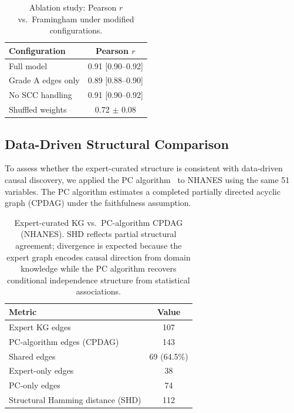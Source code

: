 \documentclass[runningheads]{llncs}
\begin{document}
\begin{table}[t]
\centering
\caption{Ablation study: Pearson $r$ vs.\ Framingham under
modified configurations.}\label{tab:ablation}
\small
\begin{tabular}{@{}lc@{}}
\toprule
\textbf{Configuration} & \textbf{Pearson $r$} \\
\midrule
Full model           & 0.91 [0.90--0.92] \\
Grade A edges only   & 0.89 [0.88--0.90] \\
No SCC handling      & 0.91 [0.90--0.92] \\
Shuffled weights     & 0.72 $\pm$ 0.08 \\
\bottomrule
\end{tabular}
\end{table}

\subsection{Data-Driven Structural Comparison}\label{sec:pcalg}

To assess whether the expert-curated structure is consistent with
data-driven causal discovery, we applied the PC
algorithm~\cite{spirtes2000causation} to NHANES using the same 51
variables.  The PC algorithm estimates a completed partially directed
acyclic graph (CPDAG) under the faithfulness assumption.

\begin{table}[t]
\centering
\caption{Expert-curated KG vs.\ PC-algorithm CPDAG (NHANES).
SHD reflects partial structural agreement; divergence is expected
because the expert graph encodes causal direction from domain
knowledge while the PC algorithm recovers conditional independence
structure from statistical associations.}\label{tab:pcalg}
\small
\begin{tabular}{@{}lc@{}}
\toprule
\textbf{Metric} & \textbf{Value} \\
\midrule
Expert KG edges                     & 107 \\
PC-algorithm edges (CPDAG)          & 143 \\
Shared edges                        & 69 (64.5\%) \\
Expert-only edges                   & 38 \\
PC-only edges                       & 74 \\
Structural Hamming distance (SHD)   & 112 \\
\bottomrule
\end{tabular}
\end{table}
\end{document}
